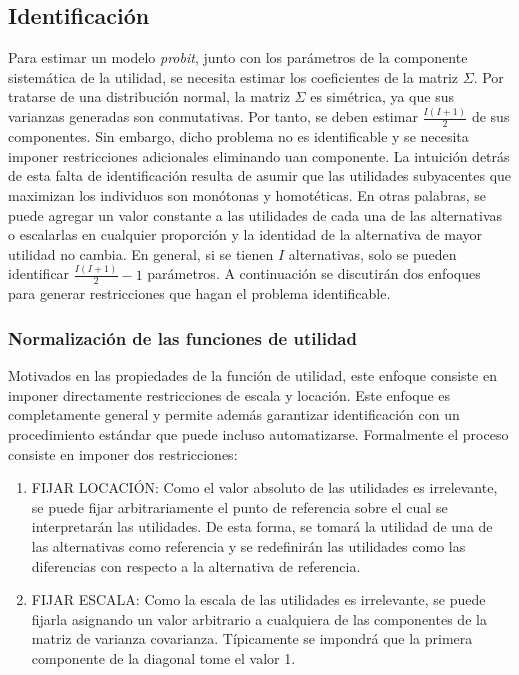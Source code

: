 \documentclass[
]{book}
\begin{document}
\hypertarget{identificaciuxf3n}{%
\subsection{Identificación}\label{identificaciuxf3n}}

Para estimar un modelo \emph{probit}, junto con los parámetros de la componente sistemática de la utilidad, se necesita estimar los coeficientes de la matriz \(\Sigma\). Por tratarse de una distribución normal, la matriz \(\Sigma\) es simétrica, ya que sus varianzas generadas son conmutativas. Por tanto, se deben estimar \(\frac{I(I+1)}{2}\) de sus componentes. Sin embargo, dicho problema no es identificable y se necesita imponer restricciones adicionales eliminando uan componente. La intuición detrás de esta falta de identificación resulta de asumir que las utilidades subyacentes que maximizan los individuos son monótonas y homotéticas. En otras palabras, se puede agregar un valor constante a las utilidades de cada una de las alternativas o escalarlas en cualquier proporción y la identidad de la alternativa de mayor utilidad no cambia. En general, si se tienen \(I\) alternativas, solo se pueden identificar \(\frac{I(I+1)}{2} - 1\) parámetros. A continuación se discutirán dos enfoques para generar restricciones que hagan el problema identificable.

\hypertarget{normalizaciuxf3n-de-las-funciones-de-utilidad}{%
\subsubsection{Normalización de las funciones de utilidad}\label{normalizaciuxf3n-de-las-funciones-de-utilidad}}

Motivados en las propiedades de la función de utilidad, este enfoque consiste en imponer directamente restricciones de escala y locación. Este enfoque es completamente general y permite además garantizar identificación con un procedimiento estándar que puede incluso automatizarse. Formalmente el proceso consiste en imponer dos restricciones:

\begin{enumerate}
\def\labelenumi{\arabic{enumi}.}
\item
  FIJAR LOCACIÓN: Como el valor absoluto de las utilidades es irrelevante, se puede fijar arbitrariamente el punto de referencia sobre el cual se interpretarán las utilidades. De esta forma, se tomará la utilidad de una de las alternativas como referencia y se redefinirán las utilidades como las diferencias con respecto a la alternativa de referencia.
\item
  FIJAR ESCALA: Como la escala de las utilidades es irrelevante, se puede fijarla asignando un valor arbitrario a cualquiera de las componentes de la matriz de varianza covarianza. Típicamente se impondrá que la primera componente de la diagonal tome el valor 1.
\end{enumerate}
\end{document}
